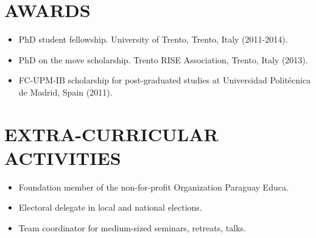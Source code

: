 \documentclass[line,margin]{res}
\begin{document}
\begin{resume}
\section{AWARDS}
\begin{itemize} \itemsep -2pt 
	\item PhD student fellowship. University of Trento, Trento, Italy (2011-2014).
	\item PhD on the move scholarship. Trento RISE Association, Trento, Italy (2013).
	\item FC-UPM-IB scholarship for post-graduated studies at Universidad Polit\'ecnica de Madrid, Spain (2011).
\end{itemize}

\section{EXTRA-CURRICULAR \\ ACTIVITIES}    
\begin{itemize} \itemsep -2pt      
	\item Foundation member of the non-for-profit Organization Paraguay Educa.
    \item Electoral delegate in local and national elections.
    \item Team coordinator for medium-sized seminars, retreats, talks.
\end{itemize}


\end{resume}
\end{document}
